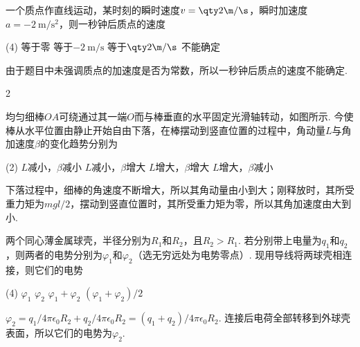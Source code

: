 \begin{problem} %
    一个质点作直线运动，某时刻的瞬时速度$v=\qty2{\m/\s}$，瞬时加速度$a=\qty{-2}{\m/\s^2}$，则一秒钟后质点的速度
    \begin{tasks}(4)
        \task 等于零
        \task 等于$\qty{-2}{\m/\s}$
        \task 等于$\qty2{\m/\s}$
        \task[\true] 不能确定
    \end{tasks}
\end{problem}
\vspace{-.75em}
\begin{solution}
    由于题目中未强调质点的加速度是否为常数，所以一秒钟后质点的速度不能确定.
\end{solution}

\begin{paracol}{2}
\begin{problem}
    均匀细棒$OA$可绕通过其一端$O$而与棒垂直的水平固定光滑轴转动，如图所示. 今使棒从水平位置由静止开始自由下落，在棒摆动到竖直位置的过程中，角动量$L$与角加速度$\beta$的变化趋势分别为
    \begin{tasks}(2)
    \task $L$减小，$\beta$减小
    \task $L$减小，$\beta$增大
    \task $L$增大，$\beta$增大
    \task[\true] $L$增大，$\beta$减小
    \end{tasks}
    \switchcolumn\vspace*{\fill}\centering
    \vspace*{\fill}
\end{problem}
\end{paracol}
\begin{solution}
    下落过程中，细棒的角速度不断增大，所以其角动量由小到大；刚释放时，其所受重力矩为$mgl/2$，摆动到竖直位置时，其所受重力矩为零，所以其角加速度由大到小.
\end{solution}

\begin{problem}
    两个同心薄金属球壳，半径分别为$R_1$和$R_2$，且$R_2>R_1$. 若分别带上电量为$q_1$和$q_2$，则两者的电势分别为$\varphi_1$和$\varphi_2$（选无穷远处为电势零点）. 现用导线将两球壳相连接，则它们的电势
    \begin{tasks}(4)
        \task $\varphi_1$
        \task $\varphi_2$
        \task $\varphi_1+\varphi_2$
        \task $(\varphi_1+\varphi_2)/2$
    \end{tasks}
\end{problem}
\begin{solution}
    $\varphi_2=q_1/4\pi\epsilon_0R_2+q_2/4\pi\epsilon_0R_2=(q_1+q_2)/4\pi\epsilon_0R_2$. 连接后电荷全部转移到外球壳表面，所以它们的电势为$\varphi_2$.
\end{solution}

